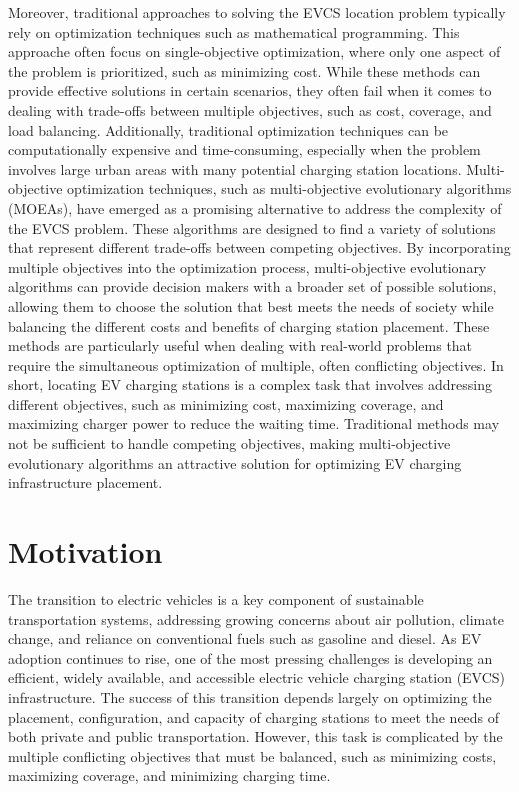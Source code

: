 \documentclass[12pt]{report}
\begin{document}
Moreover, traditional approaches to solving the EVCS location problem typically rely on optimization techniques such as mathematical programming. This approache often focus on single-objective optimization, where only one aspect of the problem is prioritized, such as minimizing cost. While these methods can provide effective solutions in certain scenarios, they often fail when it comes to dealing with trade-offs between multiple objectives, such as cost, coverage, and load balancing. Additionally, traditional optimization techniques can be computationally expensive and time-consuming, especially when the problem involves large urban areas with many potential charging station locations. Multi-objective optimization techniques, such as multi-objective evolutionary algorithms (MOEAs), have emerged as a promising alternative to address the complexity of the EVCS problem. These algorithms are designed to find a variety of solutions that represent different trade-offs between competing objectives. By incorporating multiple objectives into the optimization process, multi-objective evolutionary algorithms can provide decision makers with a broader set of possible solutions, allowing them to choose the solution that best meets the needs of society while balancing the different costs and benefits of charging station placement. These methods are particularly useful when dealing with real-world problems that require the simultaneous optimization of multiple, often conflicting objectives. In short, locating EV charging stations is a complex task that involves addressing different objectives, such as minimizing cost, maximizing coverage, and maximizing charger power to reduce the waiting time. Traditional methods may not be sufficient to handle competing objectives, making multi-objective evolutionary algorithms an attractive solution for optimizing EV charging infrastructure placement.
\section{Motivation}
The transition to electric vehicles is a key component of sustainable transportation systems, addressing growing concerns about air pollution, climate change, and reliance on conventional fuels such as gasoline and diesel. As EV adoption continues to rise, one of the most pressing challenges is developing an efficient, widely available, and accessible electric vehicle charging station (EVCS) infrastructure. The success of this transition depends largely on optimizing the placement, configuration, and capacity of charging stations to meet the needs of both private and public transportation. However, this task is complicated by the multiple conflicting objectives that must be balanced, such as minimizing costs, maximizing coverage, and minimizing charging time.
\end{document}
